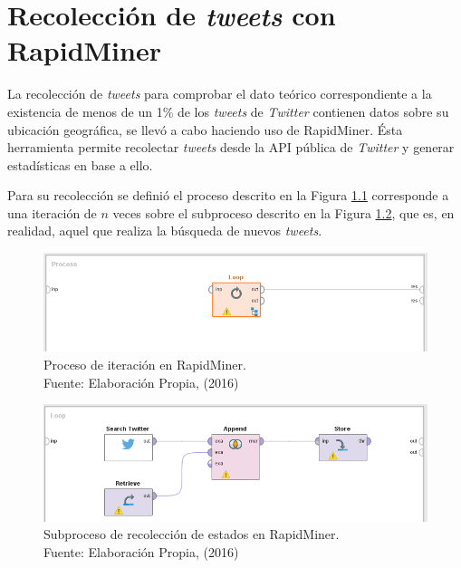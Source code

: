 
\chapter{Recolección de \textit{tweets} con RapidMiner}
\label{apendice:apendice1}

La recolección de \textit{tweets} para comprobar el dato teórico correspondiente a la existencia de menos de un 1\% de los \textit{tweets} de \textit{Twitter} contienen datos sobre su ubicación geográfica, se llevó a cabo haciendo uso de RapidMiner. Ésta herramienta permite recolectar \textit{tweets} desde la API pública de \textit{Twitter} y generar estadísticas en base a ello.

Para su recolección se definió el proceso descrito en la Figura \ref{fig:RMP} corresponde a una iteración de $n$ veces sobre el subproceso descrito en la Figura \ref{fig:RMSP}, que es, en realidad, aquel que realiza la búsqueda de nuevos \textit{tweets}.

\begin{figure}[H]
        \centering
        \captionsetup{justification=centering}
        \includegraphics[scale=0.8]{images/RMProcess.png}
        \caption[Proceso de iteración en RapidMiner.]{Proceso de iteración en RapidMiner.\\Fuente: Elaboración Propia, (2016)}
        \label{fig:RMP}
\end{figure}

\begin{figure}[H]
        \centering
        \captionsetup{justification=centering}
        \includegraphics[scale=0.8]{images/RMSProcess.png}
        \caption[Subproceso de recolección de estados en RapidMiner.]{Subproceso de recolección de estados en RapidMiner.\\Fuente: Elaboración Propia, (2016)}
        \label{fig:RMSP}
\end{figure}


